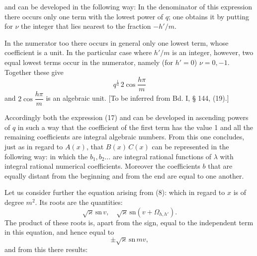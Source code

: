 and can be developed in the following way:
In the denominator of this expression there occurs only one term with
the lowest power of $q$; one obtains it by putting for $\nu$
the integer that lies nearest to the fraction $-h'/m$.

In the numerator too there occurs in general only one lowest
term, whose coefficient is a unit. In the particular
case where $h'/m$ is an integer, however, two
equal lowest terms occur in the numerator, namely (for $h'=0$) $\nu=0,-1$.
Together these give
\[
q^{\frac14}\,2\cos\frac{h\pi}{m}
\]
and $2\cos\dfrac{h\pi}{m}$ is an algebraic unit. [To be inferred from
Bd. I, § 144, (19).]

Accordingly both the expression (17) and  can be developed in ascending powers of $q$ in such a way
that the coefficient of the first term has the value 1
and all the remaining coefficients are integral algebraic numbers.
From this one concludes, just as in regard to $A(x)$, that
$B(x)\,C(x)$ can be represented in the following way:
in which the $b_1, b_2 \ldots$ are integral rational functions of $\lambda$ with integral
rational numerical coefficients. Moreover the coefficients
 $b$ that are equally distant from the beginning and from the end are
equal to one another.

Let us consider further the equation arising from (8):
which in regard to $x$ is of degree $m^2$. Its roots are the
quantities:
\[
\sqrt{\varkappa}\,\mathrm{sn}\,v, \quad \sqrt{\varkappa}\,\mathrm{sn}(v+\Omega_{h,h'}).
\]
The product of these roots is, apart from the sign,
equal to the independent term in this equation, and hence equal to
\[
\pm \sqrt{\varkappa}\,\mathrm{sn}\,mv,
\]
and from this there results:
